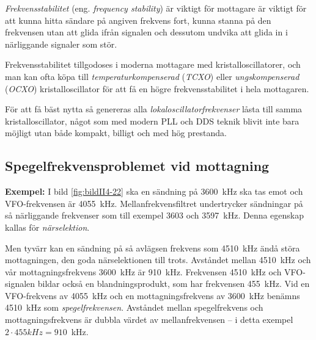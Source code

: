 \emph{Frekvensstabilitet} (eng. \emph{frequency stability}) är viktigt för
mottagare är viktigt för att kunna hitta sändare på angiven frekvens fort,
kunna stanna på den frekvensen utan att glida ifrån signalen och dessutom
undvika att glida in i närliggande signaler som stör.

Frekvensstabilitet tillgodoses i moderna mottagare med kristalloscillatorer,
och man kan ofta köpa till \emph{temperaturkompenserad} (\emph{TCXO}) eller
\emph{ungskompenserad} (\emph{OCXO}) kristalloscillator för att få en högre
frekvensstabilitet i hela mottagaren.

För att få bäst nytta så genereras alla \emph{lokaloscillatorfrekvenser} låsta
till samma kristalloscillator, något som med modern PLL och DDS teknik blivit
inte bara möjligt utan både kompakt, billigt och med hög prestanda.


\subsection{Spegelfrekvensproblemet vid mottagning}


\textbf{Exempel:}
I bild \ref{fig:bildII4-22} ska en sändning på \SI{3600}{\kilo\hertz} ska tas
emot och VFO-frekvensen är \SI{4055}{\kilo\hertz}.
Mellanfrekvensfiltret undertrycker sändningar på så närliggande frekvenser
som till exempel 3603 och \SI{3597}{\kilo\hertz}.
Denna egenskap kallas för \emph{närselektion}.

Men tyvärr kan en sändning på så avlägsen frekvens som \SI{4510}{\kilo\hertz}
ändå störa mottagningen, den goda närselektionen till trots.
Avståndet mellan \SI{4510}{\kilo\hertz} och vår mottagningsfrekvens
\SI{3600}{\kilo\hertz} är \SI{910}{\kilo\hertz}.
Frekvensen \SI{4510}{\kilo\hertz} och VFO-signalen bildar också en
blandningsprodukt, som har frekvensen \SI{455}{\kilo\hertz}.
Vid en VFO-frekvens av \SI{4055}{\kilo\hertz} och en mottagningsfrekvens av
\SI{3600}{\kilo\hertz} benämns \SI{4510}{\kilo\hertz} som
\emph{spegelfrekvensen}.
Avståndet mellan spegelfrekvens och mottagningsfrekvens är dubbla värdet av
mellanfrekvensen -- i detta exempel \(2 \cdot 455kHz = 910\)~kHz.

